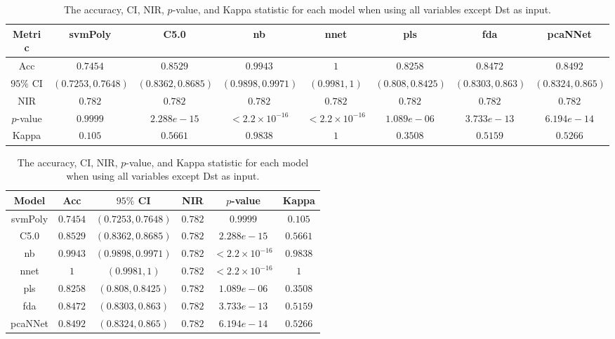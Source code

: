 \begin{table}[!ht]
	\centering
	\begin{tabular}{|c|c|c|c|c|c|c|c|}
		\hline
		Metric & svmPoly & C5.0 & nb & nnet & pls & fda & pcaNNet \\ \hline
		Acc & $0.7454$ & $0.8529$ & $0.9943$ & $1$ & $0.8258$ & $0.8472$ & $0.8492$ \\ \hline
		$95\%$ CI & $(0.7253, 0.7648)$ & $(0.8362, 0.8685)$ & $(0.9898, 0.9971)$ & $(0.9981, 1)$ & $(0.808, 0.8425)$ & $(0.8303, 0.863)$ & $(0.8324, 0.865)$ \\ \hline
		NIR & $0.782$ & $0.782$ & $0.782$ & $0.782$ & $0.782$ & $0.782$ & $0.782$ \\ \hline
		$p$-value & $0.9999$ & $2.288e-15$ & $< 2.2 \times {10}^{-16}$ & $< 2.2 \times {10}^{-16}$ & $1.089e-06$ & $3.733e-13$ & $6.194e-14$ \\ \hline
		Kappa & $0.105$ & $0.5661$ & $0.9838$ & $1$ & $0.3508$ & $0.5159$ & $0.5266$ \\ \hline
	\end{tabular}
	\caption{The accuracy, CI, NIR, $p$-value, and Kappa statistic for each model when using all variables except Dst as input.}
	\label{tab:stats:noDst}
\end{table}

\begin{table}[!ht]
	\centering
	\begin{tabular}{|c|c|c|c|c|c|}
		\hline
		Model & Acc & $95\%$ CI & NIR & $p$-value & Kappa \\ \hline
		svmPoly & $0.7454$ & $(0.7253, 0.7648)$ & $0.782$ & $0.9999$ & $0.105$ \\ \hline
		C5.0 & $0.8529$ & $(0.8362, 0.8685)$ & $0.782$ & $2.288e-15$ & $0.5661$ \\ \hline
		nb & $0.9943$ & $(0.9898, 0.9971)$ & $0.782$ & $< 2.2 \times {10}^{-16}$ & $0.9838$ \\ \hline
		nnet & $1$ & $(0.9981, 1)$ & $0.782$ & $< 2.2 \times {10}^{-16}$ & $1$ \\ \hline
		pls & $0.8258$ & $(0.808, 0.8425)$ & $0.782$ & $1.089e-06$ & $0.3508$ \\ \hline
		fda & $0.8472$ & $(0.8303, 0.863)$ & $0.782$ & $3.733e-13$ & $0.5159$ \\ \hline
		pcaNNet & $0.8492$ & $(0.8324, 0.865)$ & $0.782$ & $6.194e-14$ & $0.5266$ \\ \hline
	\end{tabular}
	\caption{The accuracy, CI, NIR, $p$-value, and Kappa statistic for each model when using all variables except Dst as input.}
	\label{tab:stats:reverse:noDst}
\end{table}

